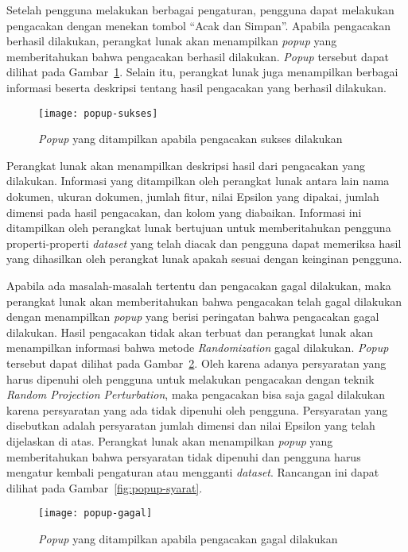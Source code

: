 Setelah pengguna melakukan berbagai pengaturan, pengguna dapat melakukan pengacakan dengan menekan tombol \textquotedblleft Acak dan Simpan\textquotedblright. Apabila pengacakan berhasil dilakukan, perangkat lunak akan menampilkan \textit{popup} yang memberitahukan bahwa pengacakan berhasil dilakukan. \textit{Popup} tersebut dapat dilihat pada Gambar~\ref{fig:popup-sukses}. Selain itu, perangkat lunak juga menampilkan berbagai informasi beserta deskripsi tentang hasil pengacakan yang berhasil dilakukan.

\begin{figure}
	\centering
	\texttt{[image: popup-sukses]}
	\caption{\textit{Popup} yang ditampilkan apabila pengacakan sukses dilakukan}
	\label{fig:popup-sukses}
\end{figure}

Perangkat lunak akan menampilkan deskripsi hasil dari pengacakan yang dilakukan. Informasi yang ditampilkan oleh perangkat lunak antara lain nama dokumen, ukuran dokumen, jumlah fitur, nilai Epsilon yang dipakai, jumlah dimensi pada hasil pengacakan, dan kolom yang diabaikan. Informasi ini ditampilkan oleh perangkat lunak bertujuan untuk memberitahukan pengguna properti-properti \textit{dataset} yang telah diacak dan pengguna dapat memeriksa hasil yang dihasilkan oleh perangkat lunak apakah sesuai dengan keinginan pengguna.

Apabila ada masalah-masalah tertentu dan pengacakan gagal dilakukan, maka perangkat lunak akan memberitahukan bahwa pengacakan telah gagal dilakukan dengan menampilkan \textit{popup} yang berisi peringatan bahwa pengacakan gagal dilakukan. Hasil pengacakan tidak akan terbuat dan perangkat lunak akan menampilkan informasi bahwa metode \textit{Randomization} gagal dilakukan. \textit{Popup} tersebut dapat dilihat pada Gambar~\ref{fig:popup-gagal}. Oleh karena adanya persyaratan yang harus dipenuhi oleh pengguna untuk melakukan pengacakan dengan teknik \textit{Random Projection Perturbation}, maka pengacakan bisa saja gagal dilakukan karena persyaratan yang ada tidak dipenuhi oleh pengguna. Persyaratan yang disebutkan adalah persyaratan jumlah dimensi dan nilai Epsilon yang telah dijelaskan di atas. Perangkat lunak akan menampilkan \textit{popup} yang memberitahukan bahwa persyaratan tidak dipenuhi dan pengguna harus mengatur kembali pengaturan atau mengganti \textit{dataset}. Rancangan ini dapat dilihat pada Gambar~\ref{fig:popup-syarat}.

\begin{figure}
	\centering
	\texttt{[image: popup-gagal]}
	\caption{\textit{Popup} yang ditampilkan apabila pengacakan gagal dilakukan}
	\label{fig:popup-gagal}
\end{figure}

